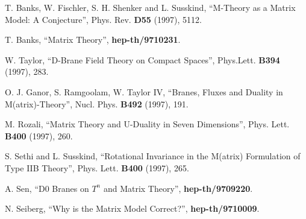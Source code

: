 \begin{thebibliography}{99}
 T. Banks, W. Fischler, S. H. Shenker and L.
Susskind, ``M-Theory as a Matrix Model: A Conjecture'', Phys.
Rev. {\bf D55} (1997), 5112. 

 T. Banks, ``Matrix Theory'', {\bf
hep-th/9710231}.

  W. Taylor, ``D-Brane Field 
Theory on Compact Spaces'', Phys.Lett. {\bf B394} (1997), 283.
  
O. J. Ganor, S. Ramgoolam, W. Taylor IV, ``Branes, Fluxes and Duality in
M(atrix)-Theory'', Nucl. Phys. {\bf B492} (1997), 191.

 M. Rozali, ``Matrix Theory and U-Duality in Seven
Dimensions'', Phys. Lett. {\bf B400} (1997), 260.

 S. Sethi and L. Susskind, ``Rotational
Invariance in the M(atrix) Formulation of Type IIB Theory'',
Phys. Lett. {\bf B400} (1997), 265.

 A. Sen, ``D$0$ Branes on $T^n$ and Matrix
Theory'', {\bf hep-th/9709220}.

 N. Seiberg, ``Why is the Matrix Model
Correct?'', {\bf hep-th/9710009}.

\vspace{20 mm}

 








\end{thebibliography}






